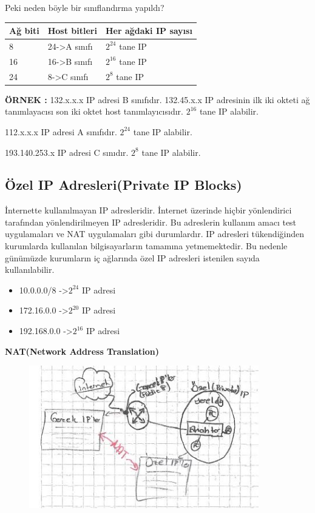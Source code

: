Peki neden böyle bir sınıflandırma yapıldı?

\begin{tabular}{l|l|l}
Ağ biti & Host bitleri & Her ağdaki IP sayısı \\
\hline
8& 24->A sınıfı &$2^{24}$ tane IP \\
16& 16->B sınıfı &$2^{16}$ tane IP \\
24&8->C sınıfı &$2^8$ tane IP \\

\end{tabular}

\textbf{ÖRNEK : } 132.x.x.x IP adresi B sınıfıdır.
132.45.x.x IP adresinin ilk iki okteti ağ tanımlayacısı son iki oktet host tanımlayıcısıdır. $2^16$ tane IP alabilir. 

112.x.x.x IP adresi A sınıfıdır. $2^{24}$ tane IP alabilir.

193.140.253.x IP adresi C sınıdır. $2^8$ tane IP alabilir.


\subsection{Özel IP Adresleri(Private IP Blocks)}

İnternette kullanılmayan IP adresleridir. İnternet üzerinde hiçbir yönlendirici tarafından yönlendirilmeyen IP adresleridir. Bu adreslerin kullanım amacı test uygulamaları ve NAT uygulamaları gibi durumlardır. IP adresleri tükendiğinden kurumlarda kullanılan bilgisayarların tamamına yetmemektedir. Bu nedenle günümüzde kurumların iç ağlarında özel IP adresleri istenilen sayıda kullanılabilir. 

\begin{itemize}
\item 10.0.0.0/8 ->$2^{24}$ IP adresi
\item 172.16.0.0 ->$2^{20}$ IP adresi
\item 192.168.0.0 ->$2^{16}$ IP adresi
\end{itemize}

\textbf{NAT(Network Address Translation)}

\begin{figure}[!ht] \centering \includegraphics[width=10cm]{images/gorsel31sayfa} \label{fig:NAT} \end{figure}


